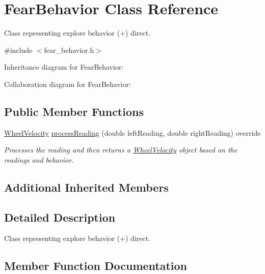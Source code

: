 \hypertarget{classFearBehavior}{}\section{Fear\+Behavior Class Reference}
\label{classFearBehavior}


Class representing explore behavior (+) direct.  




{\ttfamily \#include $<$fear\+\_\+behavior.\+h$>$}



Inheritance diagram for Fear\+Behavior\+:


Collaboration diagram for Fear\+Behavior\+:
\subsection*{Public Member Functions}
\begin{DoxyCompactItemize}
\item 
\hyperlink{structWheelVelocity}{Wheel\+Velocity} \hyperlink{classFearBehavior_a1485782dbe94d5731f98da1cbcf904b0}{process\+Reading} (double left\+Reading, double right\+Reading) override
\begin{DoxyCompactList}\small\item\em Processes the reading and then returns a \hyperlink{structWheelVelocity}{Wheel\+Velocity} object based on the readings and behavior. \end{DoxyCompactList}\end{DoxyCompactItemize}
\subsection*{Additional Inherited Members}


\subsection{Detailed Description}
Class representing explore behavior (+) direct. 

\subsection{Member Function Documentation}
